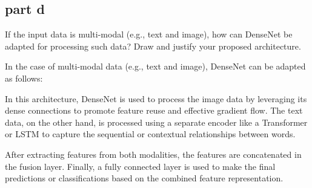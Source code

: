 \subsection{part d}
If the input data is multi-modal (e.g., text and image), how can DenseNet be adapted for processing such data? Draw and justify your proposed architecture.
\begin{qsolve}
    \begin{qsolve}[]
        In the case of multi-modal data (e.g., text and image), DenseNet can be adapted as follows:

        \begin{center}
        \end{center}
        In this architecture, DenseNet is used to process the image data by leveraging its dense connections to promote feature reuse and effective gradient flow. The text data, on the other hand, is processed using a separate encoder like a Transformer or LSTM to capture the sequential or contextual relationships between words.

After extracting features from both modalities, the features are concatenated in the fusion layer.
Finally, a fully connected layer is used to make the final predictions or classifications based on the combined feature representation.
    \end{qsolve}
\end{qsolve}